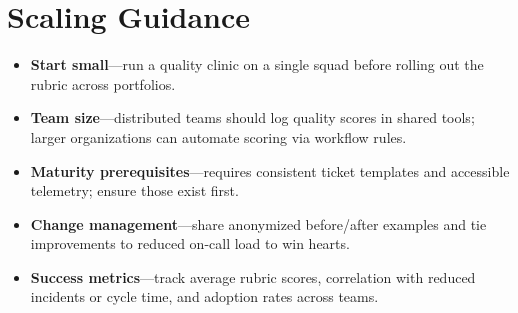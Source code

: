 \section{Scaling Guidance}
\label{sec:quality-scaling}
\begin{itemize}
    \item \textbf{Start small}—run a quality clinic on a single squad before rolling out the rubric across portfolios.
    \item \textbf{Team size}—distributed teams should log quality scores in shared tools; larger organizations can automate scoring via workflow rules.
    \item \textbf{Maturity prerequisites}—requires consistent ticket templates and accessible telemetry; ensure those exist first.
    \item \textbf{Change management}—share anonymized before/after examples and tie improvements to reduced on-call load to win hearts.
    \item \textbf{Success metrics}—track average rubric scores, correlation with reduced incidents or cycle time, and adoption rates across teams.
\end{itemize}
